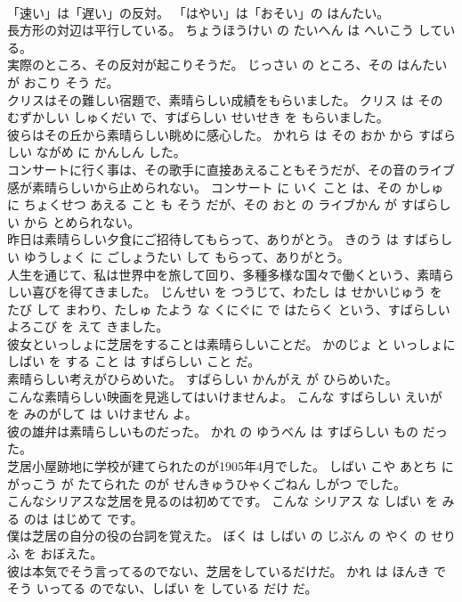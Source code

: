 \documentclass[8pt]{extreport}
\begin{document}
\begin{CJK}{UTF8}{min}
\\	「速い」は「遅い」の反対。	「はやい」は「おそい」の はんたい。	
\\	長方形の対辺は平行している。	ちょうほうけい の たいへん は へいこう している。	
\\	実際のところ、その反対が起こりそうだ。	じっさい の ところ、その はんたい が おこり そう だ。	
\\	クリスはその難しい宿題で、素晴らしい成績をもらいました。	クリス は その むずかしい しゅくだい で、すばらしい せいせき を もらいました。	
\\	彼らはその丘から素晴らしい眺めに感心した。	かれら は その おか から すばらしい ながめ に かんしん した。	
\\	コンサートに行く事は、その歌手に直接あえることもそうだが、その音のライブ感が素晴らしいから止められない。	コンサート に いく こと は、その かしゅ に ちょくせつ あえる こと も そう だが、その おと の ライブかん が すばらしい から とめられない。	
\\	昨日は素晴らしい夕食にご招待してもらって、ありがとう。	きのう は すばらしい ゆうしょく に ごしょうたい して もらって、ありがとう。	
\\	人生を通じて、私は世界中を旅して回り、多種多様な国々で働くという、素晴らしい喜びを得てきました。	じんせい を つうじて、わたし は せかいじゅう を たび して まわり、たしゅ たよう な くにぐに で はたらく という、すばらしい よろこび を えて きました。	
\\	彼女といっしょに芝居をすることは素晴らしいことだ。	かのじょ と いっしょに しばい を する こと は すばらしい こと だ。	
\\	素晴らしい考えがひらめいた。	すばらしい かんがえ が ひらめいた。	
\\	こんな素晴らしい映画を見逃してはいけませんよ。	こんな すばらしい えいが を みのがして は いけません よ。	
\\	彼の雄弁は素晴らしいものだった。	かれ の ゆうべん は すばらしい もの だった。	
\\	芝居小屋跡地に学校が建てられたのが1905年4月でした。	しばい こや あとち に がっこう が たてられた のが せんきゅうひゃくごねん しがつ でした。	
\\	こんなシリアスな芝居を見るのは初めてです。	こんな シリアス な しばい を みる のは はじめて です。	
\\	僕は芝居の自分の役の台詞を覚えた。	ぼく は しばい の じぶん の やく の せりふ を おぼえた。	
\\	彼は本気でそう言ってるのでない、芝居をしているだけだ。	かれ は ほんき で そう いってる のでない、しばい を している だけ だ。	

\end{CJK}
\end{document}
